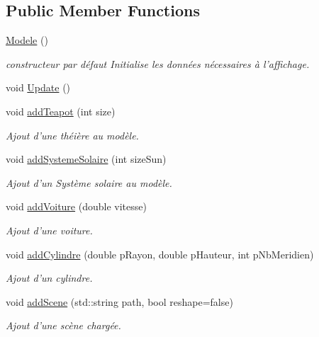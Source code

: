 \subsection*{Public Member Functions}
\begin{DoxyCompactItemize}
\item 
\hyperlink{class_modele_ae9d6a289deaebe7e8eeda46693d79d23}{Modele} ()
\begin{DoxyCompactList}\small\item\em constructeur par défaut Initialise les données nécessaires à l'affichage. \end{DoxyCompactList}\item 
void \hyperlink{class_modele_a4e09a90f4eac78fa17d362fe4ff23b2f}{Update} ()
\item 
void \hyperlink{class_modele_a3a5fdb6f258abb35347ba0610eef5ff2}{add\+Teapot} (int size)
\begin{DoxyCompactList}\small\item\em Ajout d'une théière au modèle. \end{DoxyCompactList}\item 
void \hyperlink{class_modele_a01924068a9a20616cdfe667caaa0e0e5}{add\+Systeme\+Solaire} (int size\+Sun)
\begin{DoxyCompactList}\small\item\em Ajout d'un Système solaire au modèle. \end{DoxyCompactList}\item 
void \hyperlink{class_modele_a9f572a21d86fa69563b9020ddcf7eef9}{add\+Voiture} (double vitesse)
\begin{DoxyCompactList}\small\item\em Ajout d'une voiture. \end{DoxyCompactList}\item 
void \hyperlink{class_modele_aed71c56a6b68a4cef08ff152046680f9}{add\+Cylindre} (double p\+Rayon, double p\+Hauteur, int p\+Nb\+Meridien)
\begin{DoxyCompactList}\small\item\em Ajout d'un cylindre. \end{DoxyCompactList}\item 
void \hyperlink{class_modele_a2842a0b79d9230f95a571ab5fa7c9189}{add\+Scene} (std\+::string path, bool reshape=false)
\begin{DoxyCompactList}\small\item\em Ajout d'une scène chargée. \end{DoxyCompactList}\item 

\end{DoxyCompactItemize}
